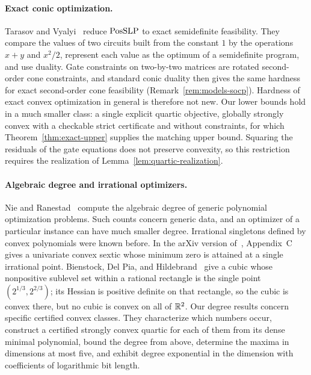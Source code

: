 \paragraph{Exact conic optimization.}
Tarasov and Vyalyi~\cite[Theorems~3 and~4]{TarasovVyalyi2008} reduce
$\mathrm{PosSLP}$ to exact semidefinite feasibility. They compare the values of two
circuits built from the constant $1$ by the operations $x+y$ and $x^2/2$,
represent each value as the optimum of a semidefinite program, and use
duality. Gate constraints on two-by-two matrices are rotated second-order
cone constraints, and standard conic duality then gives the same hardness for
exact second-order cone feasibility (Remark~\ref{rem:models-socp}). Hardness
of exact convex optimization in general is therefore not new. Our lower
bounds hold in a much smaller class: a single explicit quartic objective,
globally strongly convex with a checkable strict certificate and without
constraints, for which Theorem~\ref{thm:exact-upper} supplies the matching
upper bound. Squaring the residuals of the gate equations does not preserve
convexity, so this restriction requires the realization of
Lemma~\ref{lem:quartic-realization}.

\paragraph{Algebraic degree and irrational optimizers.}
Nie and Ranestad~\cite{NieRanestad2009} compute the algebraic degree of
generic polynomial optimization problems. Such counts concern generic data,
and an optimizer of a particular instance can have much smaller degree.
Irrational singletons defined by convex polynomials were known before. In the
arXiv version of~\cite{SlotSteurerWiedmer2025}, Appendix~C gives a univariate
convex sextic whose minimum zero is attained at a single irrational point.
Bienstock, Del Pia, and
Hildebrand~\cite[Example~2.1]{BienstockDelPiaHildebrand2023} give a cubic
whose nonpositive sublevel set within a rational rectangle is the single point
$(2^{1/3},2^{2/3})$; its Hessian is positive definite on that rectangle, so
the cubic is convex there, but no cubic is convex on all of $\mathbb R^2$. Our
degree results concern specific certified convex classes. They characterize
which numbers occur, construct a certified strongly convex quartic for each
of them from its dense minimal polynomial, bound the degree from above,
determine the maxima in dimensions at most five, and exhibit degree
exponential in the dimension with coefficients of logarithmic bit length.

